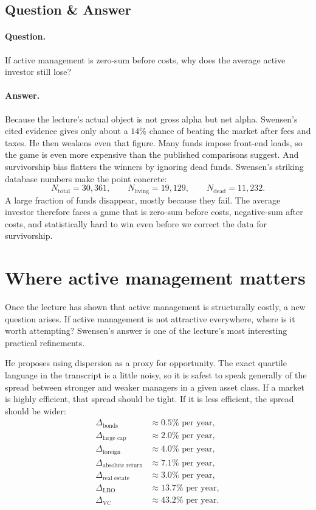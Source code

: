 \subsection{Question \& Answer}

\paragraph{Question.} If active management is zero-sum before costs, why does the average active investor still lose?

\paragraph{Answer.} Because the lecture's actual object is not gross alpha but net alpha. Swensen's cited evidence gives only about a \(14\%\) chance of beating the market after fees and taxes. He then weakens even that figure. Many funds impose front-end loads, so the game is even more expensive than the published comparisons suggest. And survivorship bias flatters the winners by ignoring dead funds. Swensen's striking database numbers make the point concrete:
\begin{equation}
N_{\text{total}}=30{,}361,\qquad N_{\text{living}}=19{,}129,\qquad N_{\text{dead}}=11{,}232.
\end{equation}
A large fraction of funds disappear, mostly because they fail. The average investor therefore faces a game that is zero-sum before costs, negative-sum after costs, and statistically hard to win even before we correct the data for survivorship.

\section{Where active management matters}

Once the lecture has shown that active management is structurally costly, a new question arises. If active management is not attractive everywhere, where is it worth attempting? Swensen's answer is one of the lecture's most interesting practical refinements.

He proposes using dispersion as a proxy for opportunity. The exact quartile language in the transcript is a little noisy, so it is safest to speak generally of the spread between stronger and weaker managers in a given asset class. If a market is highly efficient, that spread should be tight. If it is less efficient, the spread should be wider:
\begin{align}
\Delta_{\text{bonds}} &\approx 0.5\% \text{ per year},\\
\Delta_{\text{large cap}} &\approx 2.0\% \text{ per year},\\
\Delta_{\text{foreign}} &\approx 4.0\% \text{ per year},\\
\Delta_{\text{absolute return}} &\approx 7.1\% \text{ per year},\\
\Delta_{\text{real estate}} &\approx 3.0\% \text{ per year},\\
\Delta_{\text{LBO}} &\approx 13.7\% \text{ per year},\\
\Delta_{\text{VC}} &\approx 43.2\% \text{ per year}.
\end{align}

